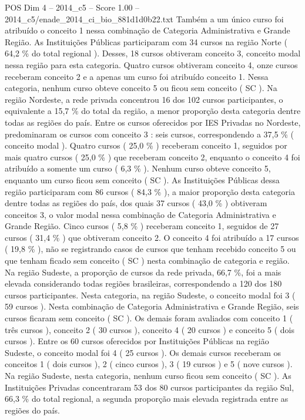 \begin{textsample}{POS Dim 4 – 2014\_c5 – Score 1.00 – 2014\_c5/enade\_2014\_ci\_bio\_881d1d0b22.txt}
Também a um único curso foi atribuído o conceito 1 nessa combinação de Categoria Administrativa e Grande Região.
As Instituições Públicas participaram com 34 cursos na região Norte ( 64,2 \% do total regional ).
Desses, 18 cursos obtiveram conceito 3, conceito modal nessa região para esta categoria.
Quatro cursos obtiveram conceito 4, onze cursos receberam conceito 2 e a apenas um curso foi atribuído conceito 1.
Nessa categoria, nenhum curso obteve conceito 5 ou ficou sem conceito ( SC ).
Na região Nordeste, a rede privada concentrou 16 dos 102 cursos participantes, o equivalente a 15,7 \% do total da região, a menor proporção desta categoria dentre todas as regiões do país.
Entre os cursos oferecidos por IES Privadas no Nordeste, predominaram os cursos com conceito 3 : seis cursos, correspondendo a 37,5 \% ( conceito modal ).
Quatro cursos ( 25,0 \% ) receberam conceito 1, seguidos por mais quatro cursos ( 25,0 \% ) que receberam conceito 2, enquanto o conceito 4 foi atribuído a somente um curso ( 6,3 \% ).
Nenhum curso obteve conceito 5, enquanto um curso ficou sem conceito ( SC ).
As Instituições Públicas dessa região participaram com 86 cursos ( 84,3 \% ), a maior proporção desta categoria dentre todas as regiões do país, dos quais 37 cursos ( 43,0 \% ) obtiveram conceitos 3, o valor modal nessa combinação de Categoria Administrativa e Grande Região.
Cinco cursos ( 5,8 \% ) receberam conceito 1, seguidos de 27 cursos ( 31,4 \% ) que obtiveram conceito 2.
O conceito 4 foi atribuído a 17 cursos ( 19,8 \% ), não se registrando casos de cursos que tenham recebido conceito 5 ou que tenham ficado sem conceito ( SC ) nesta combinação de categoria e região.
Na região Sudeste, a proporção de cursos da rede privada, 66,7 \%, foi a mais elevada considerando todas regiões brasileiras, correspondendo a 120 dos 180 cursos participantes.
Nesta categoria, na região Sudeste, o conceito modal foi 3 ( 59 cursos ).
Nesta combinação de Categoria Administrativa e Grande Região, seis cursos ficaram sem conceito ( SC ).
Os demais foram avaliados com conceito 1 ( três cursos ), conceito 2 ( 30 cursos ), conceito 4 ( 20 cursos ) e conceito 5 ( dois cursos ).
Entre os 60 cursos oferecidos por Instituições Públicas na região Sudeste, o conceito modal foi 4 ( 25 cursos ).
Os demais cursos receberam os conceitos 1 ( dois cursos ), 2 ( cinco cursos ), 3 ( 19 cursos ) e 5 ( nove cursos ).
Na região Sudeste, nesta categoria, nenhum curso ficou sem conceito ( SC ).
As Instituições Privadas concentraram 53 dos 80 cursos participantes da região Sul, 66,3 \% do total regional, a segunda proporção mais elevada registrada entre as regiões do país.

\end{textsample}
